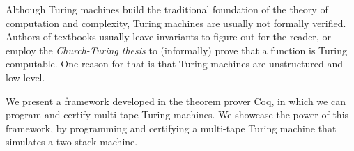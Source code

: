 Although Turing machines build the traditional foundation of the theory of computation and complexity, Turing machines are usually not formally
verified.  Authors of textbooks usually leave invariants to figure out for the reader, or employ the \textit{Church-Turing thesis} to (informally)
prove that a function is Turing computable.  One reason for that is that Turing machines are unstructured and low-level.

We present a framework developed in the theorem prover Coq, in which we can program and certify multi-tape Turing machines.  We showcase the power of
this framework, by programming and certifying a multi-tape Turing machine that simulates a two-stack machine.



